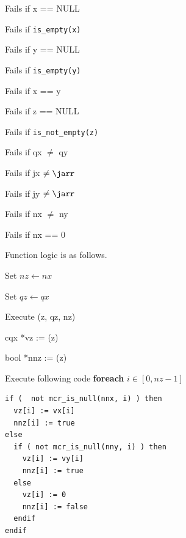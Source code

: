 \be
\item Fails if x == NULL
\item Fails if \verb+is_empty(x)+ 
\item Fails if y == NULL
\item Fails if \verb+is_empty(y)+ 
\item Fails if x == y
\item Fails if z == NULL
\item Fails if \verb+is_not_empty(z)+ 
\item Fails if qx \(\neq\) qy
\item Fails if jx \(\neq \jarr\) 
\item Fails if jy \(\neq \jarr\) 
\item Fails if nx \(\neq\) ny
\item Fails if nx == 0
  \ee

Function logic is as follows.
\be
\item Set \(nz \leftarrow nx \)
\item Set \(qz \leftarrow qx \)
\item Execute \mkUA(z, qz, nz)
\item cqx *vz := \getwv(z) 
\item bool *nnz := \getwnn(z) 
  \ee

Execute following code {\bf foreach } \(i \in [0, nz-1]\)
\begin{verbatim}
if (  not mcr_is_null(nnx, i) ) then 
  vz[i] := vx[i]
  nnz[i] := true 
else
  if ( not mcr_is_null(nny, i) ) then 
    vz[i] := vy[i]
    nnz[i] := true
  else
    vz[i] := 0
    nnz[i] := false
  endif
endif
\end{verbatim}


